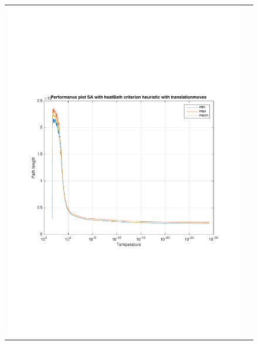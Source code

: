 \documentclass[a4paper, 11pt]{scrartcl}
\begin{document}
\begin{figure}[!ht]
\begin{tabular}{cc}
    \includegraphics[scale=0.4, trim={3cm 6cm 1cm 6cm}]{../figures/perfPlot_SA_heatBath_translation.pdf} \\ 

\end{tabular}
\end{figure}
\end{document}

